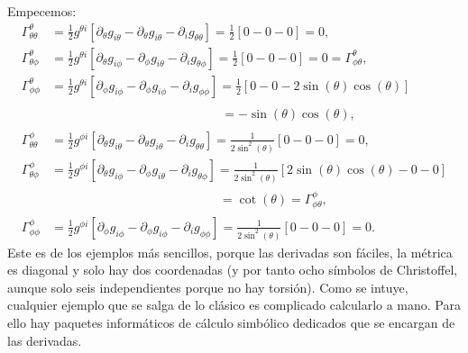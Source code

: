 \begin{example}
    Empecemos:
    \begin{align*}
        \Gamma^\theta_{\theta\theta} &= \frac{1}{2}g^{\theta i}\left[\partial_\theta g_{i\theta} - \partial_{\theta}g_{i\theta} -\partial_i g_{\theta\theta}\right] =  \frac{1}{2}\left[0 - 0 - 0\right] = 0,\\
        \Gamma^\theta_{\theta\phi} &= \frac{1}{2}g^{\theta i}\left[\partial_\theta g_{i\phi} - \partial_{\phi}g_{i\theta} -\partial_i g_{\theta\phi}\right] =  \frac{1}{2}\left[0 - 0 - 0\right] = 0= \Gamma^\theta_{\phi\theta},\\
        \Gamma^\theta_{\phi\phi} &= \frac{1}{2}g^{\theta i}\left[\partial_\phi g_{i\phi} - \partial_{\phi}g_{i\phi} -\partial_i g_{\phi\phi}\right] =  \frac{1}{2}\left[0 - 0 - 2\sin(\theta)\cos(\theta)\right] \\
        &\phantom{\ = \frac{1}{2}g^{\theta i}\left[\partial_\phi g_{i\phi} - \partial_{\phi}g_{i\phi} -\partial_i g_{\phi\phi}\right]}= -\sin(\theta)\cos(\theta),\\
        \Gamma^\phi_{\theta\theta} &= \frac{1}{2}g^{\phi i}\left[\partial_\theta g_{i\theta} - \partial_{\theta}g_{i\theta} -\partial_i g_{\theta\theta}\right] = \frac{1}{2\sin^2(\theta)}\left[0 - 0 - 0\right] = 0,\\
        \Gamma^\phi_{\theta\phi} &= \frac{1}{2}g^{\phi i}\left[\partial_\theta g_{i\phi} - \partial_{\phi}g_{i\theta} -\partial_i g_{\theta\phi}\right] =  \frac{1}{2\sin^2(\theta)}\left[2\sin(\theta)\cos(\theta) - 0 - 0\right] \\
        &\phantom{\ = \frac{1}{2}g^{\phi i}\left[\partial_\theta g_{i\phi} - \partial_{\phi}g_{i\theta} -\partial_i g_{\theta\phi}\right]}= \cot(\theta) = \Gamma^{\phi}_{\phi\theta},\\
        \Gamma^\phi_{\phi\phi} &= \frac{1}{2}g^{\phi i}\left[\partial_\phi g_{i\phi} - \partial_{\phi}g_{i\phi} -\partial_i g_{\phi\phi}\right] =  \frac{1}{2\sin^2(\theta)}\left[0 - 0 - 0\right] = 0.
    \end{align*}
    Este es de los ejemplos más sencillos, porque las derivadas son fáciles, la métrica es diagonal y solo hay dos coordenadas (y por tanto ocho símbolos de Christoffel, aunque solo seis independientes porque no hay torsión). Como se intuye, cualquier ejemplo que se salga de lo clásico es complicado calcularlo a mano. Para ello hay paquetes informáticos de cálculo simbólico dedicados que se encargan de las derivadas. 
\end{example}

